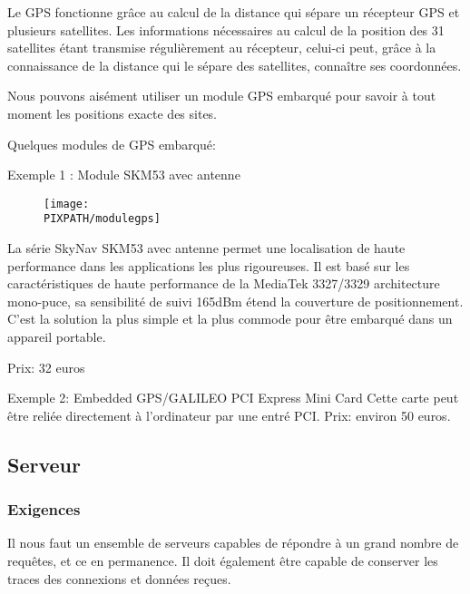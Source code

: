 Le GPS fonctionne grâce au calcul de la distance qui sépare un récepteur GPS et plusieurs satellites. Les informations nécessaires au calcul de la position des 31 satellites étant transmise régulièrement au récepteur, celui-ci peut, grâce à la connaissance de la distance qui le sépare des satellites, connaître ses coordonnées.

Nous pouvons aisément utiliser un module GPS embarqué pour savoir à tout moment les positions exacte des sites.

Quelques modules de GPS embarqué:
\begin{description}
\item Exemple 1 : Module SKM53 avec antenne

    \begin{figure}[!h]
    \begin{center}
    \texttt{[image: \\PIXPATH/modulegps]}
    \caption{}
    \end{center}
    \end{figure}
La série SkyNav SKM53 avec antenne permet une localisation de haute performance dans les applications les plus rigoureuses.
Il est basé sur les caractéristiques de haute performance de la MediaTek 3327/3329 architecture mono-puce, sa sensibilité de suivi 165dBm étend la couverture de positionnement. C'est la solution la plus simple et la plus commode pour être embarqué dans un appareil portable.

Prix: 32 euros

\item Exemple 2: Embedded GPS/GALILEO PCI Express Mini Card
Cette carte peut être reliée directement à l'ordinateur par une entré PCI.
Prix: environ 50 euros.
\end{description}
\subsection{Serveur}

    \subsubsection{Exigences}
    Il nous faut un ensemble de serveurs capables de répondre à un grand
    nombre de requêtes, et ce en permanence. Il doit également être capable
    de conserver les traces des connexions et données reçues.

